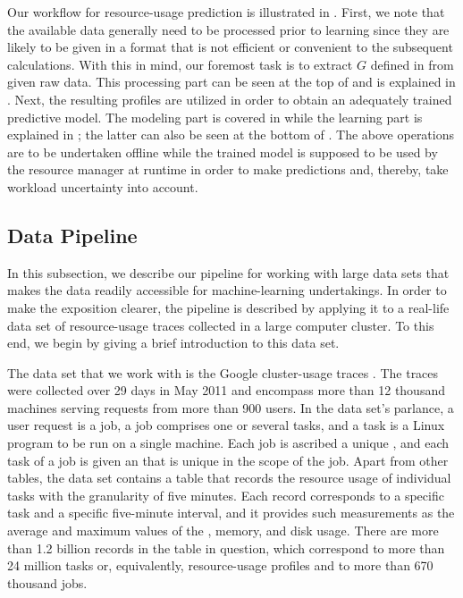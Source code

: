 Our workflow for resource-usage prediction is illustrated in
. First, we note that the available data generally need to
be processed prior to learning since they are likely to be given in a format
that is not efficient or convenient to the subsequent calculations. With this in
mind, our foremost task is to extract $G$ defined in  from
given raw data. This processing part can be seen at the top of
 and is explained in . Next, the
resulting profiles are utilized in order to obtain an adequately trained
predictive model. The modeling part is covered in 
while the learning part is explained in ; the
latter can also be seen at the bottom of . The above
operations are to be undertaken offline while the trained model is supposed to
be used by the resource manager at runtime in order to make predictions and,
thereby, take workload uncertainty into account.

\subsection{Data Pipeline}

In this subsection, we describe our pipeline for working with large data sets
that makes the data readily accessible for machine-learning undertakings. In
order to make the exposition clearer, the pipeline is described by applying it
to a real-life data set of resource-usage traces collected in a large computer
cluster. To this end, we begin by giving a brief introduction to this data set.

The data set that we work with is the Google cluster-usage traces
\cite{reiss2011}. The traces were collected over 29 days in May 2011 and
encompass more than 12 thousand machines serving requests from more than 900
users. In the data set's parlance, a user request is a job, a job comprises one
or several tasks, and a task is a Linux program to be run on a single machine.
Each job is ascribed a unique , and each task of a job is given an
 that is unique in the scope of the job. Apart from other tables, the
data set contains a table that records the resource usage of individual tasks
with the granularity of five minutes. Each record corresponds to a specific task
and a specific five-minute interval, and it provides such measurements as the
average and maximum values of the , memory, and disk usage. There are
more than 1.2 billion records in the table in question, which correspond to more
than 24 million tasks or, equivalently, resource-usage profiles and to more than
670 thousand jobs.


